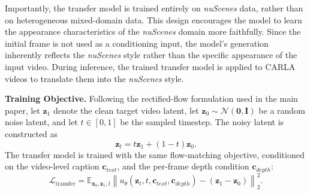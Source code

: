 \documentclass[runningheads]{llncs}
\begin{document}
Importantly, the transfer model is trained entirely on \textit{nuScenes} data, rather than on heterogeneous mixed-domain data. This design encourages the model to learn the appearance characteristics of the \textit{nuScenes} domain more faithfully. Since the initial frame is not used as a conditioning input, the model’s generation inherently reflects the \textit{nuScenes} style rather than the specific appearance of the input video. During inference, the trained transfer model is applied to CARLA videos to translate them into the \textit{nuScenes} style.

\setlength{\parskip}{1pt}
\noindent \textbf{Training Objective.} Following the rectified-flow formulation used in the main paper, let $\mathbf{z}_1$ denote the clean target video latent, let $\mathbf{z}_0 \sim \mathcal{N}(\mathbf{0}, \mathbf{I})$ be a random noise latent, and let $t \in [0,1]$ be the sampled timestep. The noisy latent is constructed as
\begin{equation}
    \mathbf{z}_t = t\mathbf{z}_1 + (1-t)\mathbf{z}_0 .
\end{equation}
The transfer model is trained with the same flow-matching objective, conditioned on the video-level caption $\mathbf{c}_{text}$, and the per-frame depth condition $\mathbf{c}_{depth}$:
\begin{equation}
    \mathcal{L}_{\text{transfer}}=
    \mathbb{E}_{\mathbf{z}_0,\mathbf{z}_1,t}
    \left\|
    u_\theta(\mathbf{z}_t,t,\mathbf{c}_{text},\mathbf{c}_{depth})
    -
    (\mathbf{z}_1-\mathbf{z}_0)
    \right\|_2^2 .
\end{equation}





\end{document}
